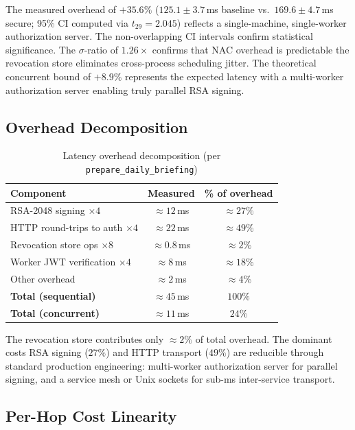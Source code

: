 \documentclass[journal]{IEEEtran}
\begin{document}
The measured overhead of $+35.6\%$ ($125.1 \pm 3.7$\,ms baseline vs.\
$169.6 \pm 4.7$\,ms secure; 95\% CI computed via $t_{29} = 2.045$) reflects
a single-machine, single-worker authorization server. The non-overlapping CI
intervals confirm statistical significance. The $\sigma$-ratio of $1.26\times$
confirms that NAC overhead is predictable the revocation store eliminates
cross-process scheduling jitter. The theoretical concurrent bound of $+8.9\%$
represents the expected latency with a multi-worker authorization server enabling
truly parallel RSA signing.

\subsection{Overhead Decomposition}
\label{sec:overhead}

\begin{table}[h]
\caption{Latency overhead decomposition (per \texttt{prepare\_daily\_briefing})}
\label{tab:decomp}
\centering
\footnotesize
\begin{tabular}{lcc}
\toprule
\textbf{Component} & \textbf{Measured} & \textbf{\% of overhead} \\
\midrule
RSA-2048 signing $\times 4$         & $\approx 12$\,ms  & $\approx 27\%$ \\
HTTP round-trips to auth $\times 4$ & $\approx 22$\,ms  & $\approx 49\%$ \\
Revocation store ops $\times 8$     & $\approx 0.8$\,ms & $\approx 2\%$  \\
Worker JWT verification $\times 4$  & $\approx 8$\,ms   & $\approx 18\%$ \\
Other overhead                      & $\approx 2$\,ms   & $\approx 4\%$  \\
\midrule
\textbf{Total (sequential)}         & $\approx 45$\,ms  & $100\%$ \\
\textbf{Total (concurrent)}         & $\approx 11$\,ms  & $24\%$  \\
\bottomrule
\end{tabular}
\end{table}

The revocation store contributes only $\approx 2\%$ of total overhead. The
dominant costs RSA signing ($27\%$) and HTTP transport ($49\%$) are
reducible through standard production engineering: multi-worker authorization
server for parallel signing, and a service mesh or Unix sockets for sub-ms
inter-service transport.

\subsection{Per-Hop Cost Linearity}
\end{document}
